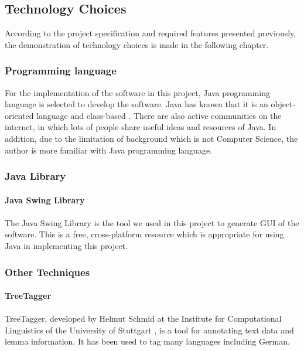 \subsection{Technology Choices}
According to the project specification and required features presented previously, the demonstration of technology choices is made in the following chapter.
\subsubsection{Programming language}
For the implementation of the software in this project, Java programming language is selected to develop the software.  Java has known that it is an object-oriented language and class-based \cite{Gosling2014}. There are also active communities on the internet, in which lots of people share useful ideas and resources of Java. In addition, due to the limitation of background which is not Computer Science, the author is more familiar with Java programming language.  

\subsubsection{Java Library}

\paragraph{Java Swing Library}
\paragraph[]{} The Java Swing Library is the tool we used in this project to generate GUI of the software. This is a free, cross-platform resource which is appropriate for using Java in implementing this project.

\subsubsection{Other Techniques}

\paragraph{TreeTagger}
\paragraph[]{}TreeTagger, developed by Helmut Schmid at the Institute for Computational Linguistics of the University of Stuttgart \cite{TreeTagger}, is a tool for annotating text data and lemma information. It has been used to tag many languages including German.

